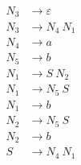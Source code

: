 \begin{align*}
N_3 &\rightarrow \varepsilon \\
N_3 &\rightarrow N_4\ N_1 \\
N_4 &\rightarrow a \\
N_5 &\rightarrow b \\
N_1 &\rightarrow S\ N_2 \\
N_1 &\rightarrow N_5\ S \\
N_1 &\rightarrow b \\
N_2 &\rightarrow N_5\ S \\
N_2 &\rightarrow b \\
S &\rightarrow N_4\ N_1 \\
\end{align*}